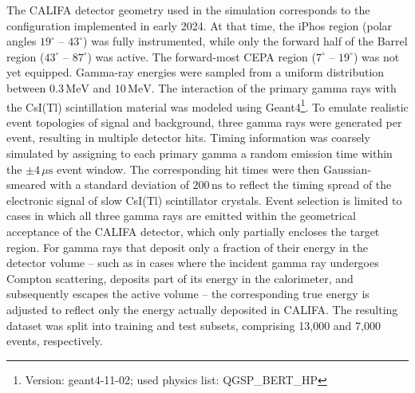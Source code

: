 \documentclass[review,sort&compress]{elsarticle}
\begin{document}
The CALIFA detector geometry used in the simulation corresponds to the configuration implemented in early 2024. At that time, the iPhos region (polar angles $19^\circ$ -- $43^\circ$) was fully instrumented, while only the forward half of the Barrel region ($43^\circ$ -- $87^\circ$) was active. The forward-most CEPA region ($7^\circ$ -- $19^\circ$) was not yet equipped.\newline
Gamma-ray energies were sampled from a uniform distribution between $0.3\,\mathrm{MeV}$ and $10\,\mathrm{MeV}$. The interaction of the primary gamma rays with the CsI(Tl) scintillation material was modeled using Geant4\footnote{Version: geant4-11-02; used physics list: QGSP\_BERT\_HP}.\newline
To emulate realistic event topologies of signal and background, three gamma rays were generated per event, resulting in multiple detector hits. Timing information was coarsely simulated by assigning to each primary gamma a random emission time within the $\pm 4\,\mu\mathrm{s}$ event window. The corresponding hit times were then Gaussian-smeared with a standard deviation of $200\,\mathrm{ns}$ to reflect the timing spread of the electronic signal of slow CsI(Tl) scintillator crystals.\newline
Event selection is limited to cases in which all three gamma rays are emitted within the geometrical acceptance of the CALIFA detector, which only partially encloses the target region. For gamma rays that deposit only a fraction of their energy in the detector volume -- such as in cases where the incident gamma ray undergoes Compton scattering, deposits part of its energy in the calorimeter, and subsequently escapes the active volume -- the corresponding true energy is adjusted to reflect only the energy actually deposited in CALIFA.\newline
The resulting dataset was split into training and test subsets, comprising 13{,}000 and 7{,}000 events, respectively.
\end{document}
